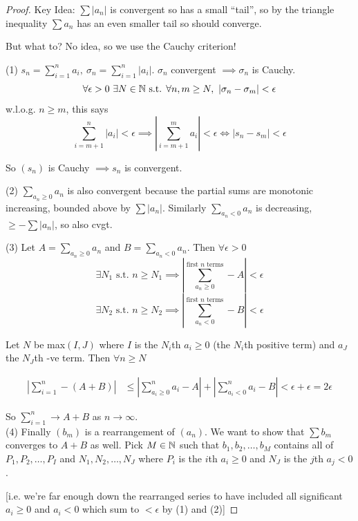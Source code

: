 \documentclass[10pt,twoside]{scrartcl}
\begin{document}
\begin{proof} 
Key Idea: $\sum |a_n|$ is convergent so has a small ``tail'', so by the triangle inequality $\sum a_n$ has an even smaller tail so should converge. 

But what to? No idea, so we use the Cauchy criterion! 

(1) $s_n = \sum_{i=1}^n a_i,~\sigma_n = \sum_{i=1}^n |a_i|$. $\sigma_n$ convergent $\implies \sigma_n$ is Cauchy. 
\[\forall \epsilon > 0~\exists N \in\mathbb{N} \text{ s.t. } \forall n,m \geq N,~|\sigma_n - \sigma_m | < \epsilon\]
w.l.o.g. $n \geq m$, this says 
\[\sum_{i=m+1}^n |a_i| < \epsilon \implies \left|\sum_{i=m+1}^m a_i \right| < \epsilon \iff |s_n - s_m| < \epsilon\]

So $(s_n)$ is Cauchy $\implies s_n$ is convergent. 

(2) $\sum_{a_n \geq 0} a_n$ is also convergent because the partial sums are monotonic increasing, bounded above by $\sum |a_n|$. Similarly $\sum_{a_n < 0} a_n$ is decreasing, $\geq -\sum |a_n|$, so also cvgt. 

(3) Let $A = \sum_{a_n \geq 0} a_n$ and $B = \sum_{a_n < 0} a_n$. Then $\forall \epsilon >0$
\[\exists N_1 \text{ s.t. } n \geq N_1 \implies \left| \sum_{a_n \geq 0}^{\text{first } n \text{ terms}} - A\right| < \epsilon \]
\[\exists N_2 \text{ s.t. } n \geq N_2 \implies \left| \sum_{a_n < 0}^{\text{first } n \text{ terms}} - B\right| < \epsilon \]

Let $N$ be max$(I,J)$ where $I$ is the $N_i$th $a_i \geq 0$ (the $N_i$th positive term) and $a_J$ the $N_J$th -ve term. Then $\forall n \geq N$

\begin{align*}\left|\sum_{i=1}^n - (A+B)\right| 
&\leq \left|\sum_{a_i \geq 0}^n a_i - A\right| + \left|\sum_{a_i < 0}^n a_i - B\right| < \epsilon + \epsilon = 2\epsilon 
\end{align*}

So $\sum_{i=1}^n \to A+B$ as $n \to \infty$.\\

(4) Finally $(b_m)$ is a rearrangement of $(a_n)$. We want to show that $\sum b_m$ converges to $A+B$ as well. Pick $M \in\mathbb{N}$ such that $b_1,b_2,\dots,b_M$ contains all of $P_1,P_2,\dots,P_I$ and $N_1,N_2,\dots,N_J$ where $P_i$ is the $i$th $a_i \geq 0$ and $N_J$ is the $j$th $a_j <0$. 

[i.e. we're far enough down the rearranged series to have included all significant $a_i \geq 0$ and $a_i <0$ which sum to $<\epsilon$ by (1) and (2)]


\end{proof}
\end{document}
